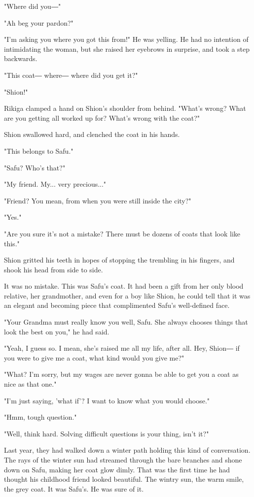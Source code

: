 "Where did you―"

"Ah beg your pardon?"

"I'm asking you where you got this from!" He was yelling. He had no
intention of intimidating the woman, but she raised her eyebrows in
surprise, and took a step backwards.

"This coat― where― where did you get it?"

"Shion!"

Rikiga clamped a hand on Shion's shoulder from behind. "What's wrong?
What are you getting all worked up for? What's wrong with the coat?"

Shion swallowed hard, and clenched the coat in his hands.

"This belongs to Safu."

"Safu? Who's that?"

"My friend. My... very precious..."

"Friend? You mean, from when you were still inside the city?"

"Yes."

"Are you sure it's not a mistake? There must be dozens of coats that
look like this."

Shion gritted his teeth in hopes of stopping the trembling in his
fingers, and shook his head from side to side.

It was no mistake. This was Safu's coat. It had been a gift from her
only blood relative, her grandmother, and even for a boy like Shion, he
could tell that it was an elegant and becoming piece that complimented
Safu's well-defined face.

"Your Grandma must really know you well, Safu. She always chooses things
that look the best on you," he had said.

"Yeah, I guess so. I mean, she's raised me all my life, after all. Hey,
Shion― if you were to give me a coat, what kind would you give me?"

"What? I'm sorry, but my wages are never gonna be able to get you a coat
as nice as that one."

"I'm just saying, 'what if'? I want to know what you would choose."

"Hmm, tough question."

"Well, think hard. Solving difficult questions is your thing, isn't it?"

Last year, they had walked down a winter path holding this kind of
conversation. The rays of the winter sun had streamed through the bare
branches and shone down on Safu, making her coat glow dimly. That was
the first time he had thought his childhood friend looked beautiful. The
wintry sun, the warm smile, the grey coat. It was Safu's. He was sure of
it.

